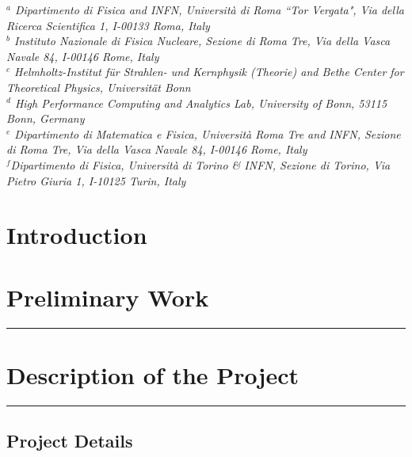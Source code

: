 \documentclass [a4paper, 11pt]{article}
\begin{document}
\textit{$^a$ Dipartimento di Fisica and INFN, Universit\`a di Roma ``Tor Vergata", Via della Ricerca Scientifica 1, I-00133 Roma, Italy}\\
\textit{$^b$ Instituto Nazionale di Fisica Nucleare, Sezione di Roma Tre, Via della Vasca Navale 84, I-00146 Rome, Italy }\\
\textit{$^c$ Helmholtz-Institut f{\"u}r Strahlen- und Kernphysik (Theorie) and Bethe Center for Theoretical Physics, Universit{\"a}t Bonn}\\
\textit{$^d$ High Performance Computing and Analytics Lab, University of Bonn, 53115 Bonn, Germany} \\
\textit{$^e$ Dipartimento di Matematica e Fisica, Universit\`a Roma Tre and INFN, Sezione di Roma Tre, Via della Vasca Navale 84, I-00146 Rome, Italy} \\
\textit{$^f$Dipartimento di Fisica, Università di Torino \& INFN, Sezione di Torino, Via Pietro Giuria 1, I-10125 Turin, Italy}\\

\vfill

\newpage

\vfill
\tableofcontents
\vfill

\newpage

\section{Introduction}




\section{Preliminary Work}
\rule{\textwidth}{0.4pt} 




\section{Description of the Project}
\rule{\textwidth}{0.4pt}
\subsection{Project Details}
\end{document}
